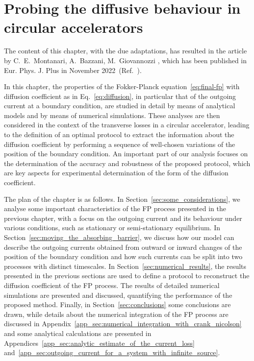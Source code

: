 \chapter{Probing the diffusive behaviour in circular accelerators}\label{ch:probing}

\noindent\textsf{The content of this chapter, with the due adaptations, has resulted in the article by C.\ E.\ Montanari, A.\ Bazzani, M.\ Giovannozzi \textit{}, which has been published in Eur. Phys. J. Plus in November 2022~(Ref.~\cite{our_paper9}).}

\vspace{3em}

In this chapter, the properties of the Fokker-Planck equation~\eqref{eq:final-fp} with diffusion coefficient as in Eq.~\eqref{eq:diffusion}, in particular that of the outgoing current at a boundary condition, are studied in detail by means of analytical models and by means of numerical simulations. These analyses are then considered in the context of the transverse losses in a circular accelerator, leading to the definition of an optimal protocol to extract the information about the diffusion coefficient by performing a sequence of well-chosen variations of the position of the boundary condition. An important part of our analysis focuses on the determination of the accuracy and robustness of the proposed protocol, which are key aspects for experimental determination of the form of the diffusion coefficient.

The plan of the chapter is as follows. In Section~\ref{sec:some_considerations}, we analyse some important characteristics of the FP process presented in the previous chapter, with a focus on the outgoing current and its behaviour under various conditions, such as stationary or semi-stationary equilibrium. In Section~\ref{sec:moving_the_absorbing_barrier}, we discuss how our model can describe the outgoing currents obtained from outward or inward changes of the position of the boundary condition and how such currents can be split into two processes with distinct timescales. In Section~\ref{sec:numerical_results}, the results presented in the previous sections are used to define a protocol to reconstruct the diffusion coefficient of the FP process. The results of detailed numerical simulations are presented and discussed, quantifying the performance of the proposed method. Finally, in Section~\ref{sec:conclusions} some conclusions are drawn, while details about the numerical integration of the FP process are discussed in Appendix~\ref{app_sec:numerical_integration_with_crank_nicolson} and some analytical calculations are presented in Appendices~\ref{app_sec:analytic_estimate_of_the_current_loss} and~\ref{app_sec:outgoing_current_for_a_system_with_infinite_source}.

